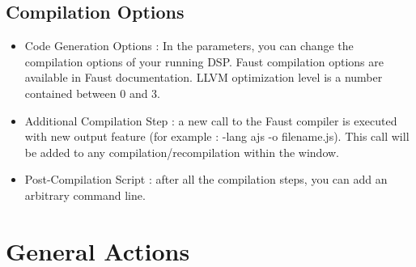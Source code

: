 \documentclass[a4paper]{article}
\begin{document}



\subsection{Compilation Options}

\begin{itemize}

\item Code Generation Options : In the parameters, you can change the compilation options of your running DSP. Faust compilation options are available in Faust documentation. LLVM optimization level is a number contained between 0 and 3. 

\item Additional Compilation Step : a new call to the Faust compiler is executed with new output feature (for example : -lang ajs -o filename.js). This call will be added to any compilation/recompilation within the window.

\item Post-Compilation Script : after all the compilation steps, you can add an arbitrary command line.

\end{itemize}

\section{General Actions}
\end{document}

